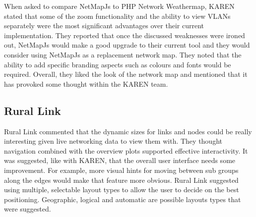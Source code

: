 \documentclass[11pt, a4paper]{article}
\begin{document}
When asked to compare NetMapJs to PHP Network Weathermap, KAREN stated that some
of the zoom functionality and the ability to view VLANs separately were the most
significant advantages over their current implementation. They reported that
once the discussed weaknesses were ironed out, NetMapJs would make a good upgrade
to their current tool and they would consider using NetMapJs as a replacement
network map. They noted that the ability to add specific branding aspects such as
colours and fonts would be required. Overall, they liked the look of the network
map and mentioned that it has provoked some thought within the KAREN team.


\subsection{Rural Link}

Rural Link commented that the dynamic sizes for links and nodes could be really
interesting given live networking data to view them with. They thought
navigation combined with the overview plots supported effective interactivity.
It was suggested, like with KAREN, that the overall user interface needs some
improvement. For example, more visual hints for moving between sub groups along
the edges would make that feature more obvious. Rural Link suggested using
multiple, selectable layout types to allow the user to decide on the best
positioning. Geographic, logical and automatic are possible layouts types that
were suggested.
\end{document}
